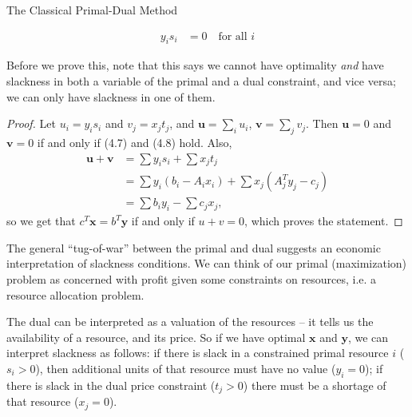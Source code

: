 \begin{section}{The Classical Primal-Dual Method}
\begin{theorem}
\begin{align}
			y_is_i &= 0 \quad \text{for all } i
		\end{align}
	\end{theorem}
	Before we prove this, note that this says we cannot have optimality \emph{and} have slackness in 
	both a variable of the primal and a dual constraint, and vice versa; we can only have slackness 
	in one of them.
	\begin{proof}
		Let $u_i = y_is_i$ and $v_j = x_jt_j$, and $\mathbf{u} = \sum_i u_i$, 
		$\mathbf{v} = \sum_j v_j$. Then $\mathbf{u} = 0$ and $\mathbf{v} = 0$ if and only if 
		(4.7) and (4.8) hold. Also, 
		\begin{align*}
			\mathbf{u} + \mathbf{v} &= \sum y_is_i + \sum x_jt_j \\
						&= \sum y_i(b_i - A_ix_i) + \sum x_j (A^{T}_jy_j-c_j)\\
						&= \sum b_iy_i - \sum c_jx_j,
		\end{align*}
		so we get that $c^{T}\mathbf{x} = b^{T}\mathbf{y}$ if and only if $u + v = 0$, which 
		proves the statement.	
	\end{proof}
	The general ``tug-of-war'' between the primal and dual suggests an economic interpretation 
	of slackness conditions. We can think of our primal (maximization) problem as concerned with 
	profit given some constraints on resources, i.e. a resource allocation problem. 
	
	The dual can 
	be interpreted as a valuation of the resources -- it tells us the availability of a resource, 
	and its price. So if we have optimal $\mathbf{x}$ and $\mathbf{y}$, we can interpret 
	slackness as follows: if there is slack in a constrained primal resource $i$ ($s_i > 0$), 
	then additional units of that resource must have no value ($y_i = 0$); if there is slack 
	in the dual price constraint ($t_j > 0$) there must be a shortage of that resource ($x_j = 0$).


\end{section}
